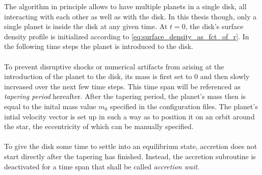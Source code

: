     \newpage \noindent
    The algorithm in principle allows to have multiple planets in a single disk,
    all interacting with each other as well as with the disk. In this thesis 
    though,
    only a single planet is inside the disk at any given time. At $t=0$, the 
    disk's surface density profile is initialized according to 
    \autoref{eq:surface_density_as_fct_of_r}.
    In the following time steps the planet is introduced to the disk. \\
    \\
    To prevent disruptive shocks or numerical artifacts from arising at 
    the introduction of the planet to the disk,
    its mass is first set to $0$ and then slowly 
    increased over the next few time steps. This time span will be referenced 
    as \textit{tapering period} hereafter. After the tapering period, the 
    planet's mass then is equal to the inital mass value $m_0$ specified in the 
    configuration files. The planet's intial velocity vector is set up in 
    such a way as to position it on an orbit around the star, the 
    eccentricity of which can be manually specified. \\
    \\
    To give the disk some time to settle into an equilibrium state, 
    accretion does not start directly after the tapering has finished.
    Instead, the accretion subroutine is deactivated for a time span that 
    shall be called \textit{accretion wait}. \\
    \\
